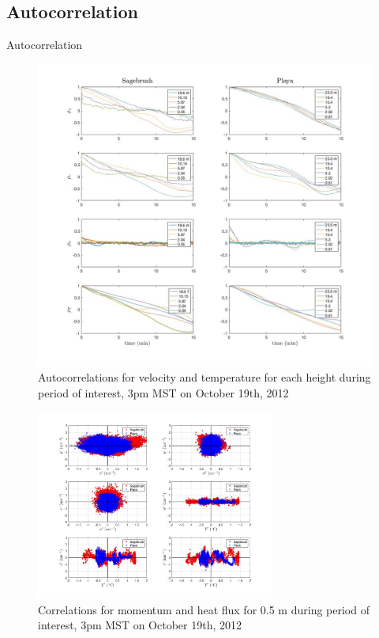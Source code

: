 \documentclass{beamer}
\begin{document}
\subsection{Autocorrelation}
\begin{frame}{Autocorrelation}
	\begin{figure}
		\centering
		\includegraphics[width=0.6\linewidth]{plots/auto_corr_fig}
		\caption{Autocorrelations for velocity and temperature for each height during period of interest, 3pm MST on October 19th, 2012}
		\label{fig:auto_corr_fig}
	\end{figure}
\end{frame}
\begin{frame}
	\begin{figure}[t!]
        \centering
		\includegraphics[width=0.7\textwidth]{plots/momentum_corr_05m}
		\caption{Correlations for momentum and heat flux for 0.5 m during period of interest, 3pm MST on October 19th, 2012}
	\end{figure}
\end{frame}
\end{document}
